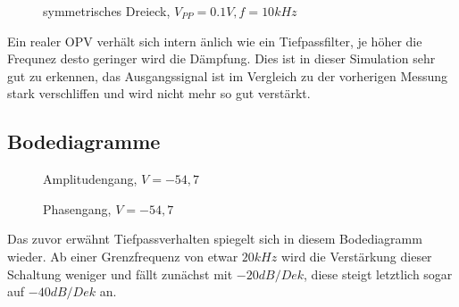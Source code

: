 \begin{figure}[H]
  \centering
  \caption{symmetrisches Dreieck, $V_{PP}=0.1V, f=10kHz$}
\end{figure}
\noindent
Ein realer OPV verh\"alt sich intern \"anlich wie ein Tiefpassfilter, je h\"oher die Frequnez desto geringer wird die D\"ampfung. Dies ist in dieser Simulation sehr gut zu erkennen, das Ausgangssignal ist im Vergleich zu der vorherigen Messung stark verschliffen und wird nicht mehr so gut verst\"arkt.


\subsection{Bodediagramme}
\begin{figure}[H]
  \centering
  \caption{Amplitudengang, $V=-54,7$}
\end{figure}
\begin{figure}[H]
  \centering
  \caption{Phasengang, $V=-54,7$}
\end{figure}
\noindent
Das zuvor erw\"ahnt Tiefpassverhalten spiegelt sich in diesem Bodediagramm wieder. Ab einer Grenzfrequenz von etwar $20kHz$ wird die Verst\"arkung dieser Schaltung weniger und f\"allt zun\"achst mit $-20dB/Dek$, diese steigt letztlich sogar auf $-40dB/Dek$ an.

